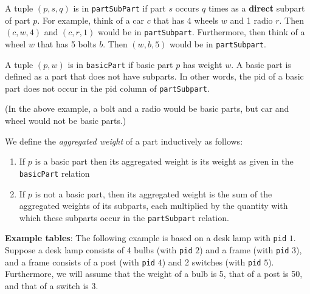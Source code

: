 \documentclass{article}
\begin{document}
\begin{enumerate}[resume]
A tuple $(p, s, q)$  
is in {\tt partSubPart} if  part $s$ occurs $q$ times as a {\bf
    direct} subpart of part $p$.  For example, think of a car $c$ that has 4
  wheels $w$ and 1 radio $r$. Then $(c,w,4)$ and $(c,r,1)$ would be in {\tt partSubpart}.  Furthermore, then think of a wheel $w$ that has 5 bolts $b$.
  Then $(w,b,5)$ would be in {\tt partSubpart}.
  
  A  tuple $(p, w)$ is in {\tt basicPart} if basic part $p$ has
  weight $w$.  A basic part is defined as a part that does not have
  subparts.  In other words, the pid of a basic part does not occur
  in the pid column of {\tt partSubpart}.

 (In the above example, a bolt and a radio would be basic parts, but car and
 wheel would not be basic parts.)

We define the \emph{aggregated weight} of a part inductively as follows:
\begin{enumerate}
\item If $p$ is a basic part then its aggregated weight is its weight as given in
the {\tt basicPart} relation
\item If $p$ is not a basic part, then its aggregated weight is the
sum of the aggregated weights of its subparts, each multiplied by the
quantity with which these subparts occur in the {\tt partSubpart} relation.
\end{enumerate}

\newpage
\textbf{Example tables}: The following example is based on a desk
lamp with {\tt pid} $1$. Suppose a desk lamp consists of 4 bulbs (with {\tt pid} $2$)  and a frame (with {\tt pid} $3$), and a frame
consists of a post (with {\tt pid} $4$) and 2 switches (with {\tt pid} $5$). 
Furthermore, we will assume that the weight of a bulb is 5, that of a post is 50, and that of a switch
is 3. 


\end{enumerate}
\end{document}
